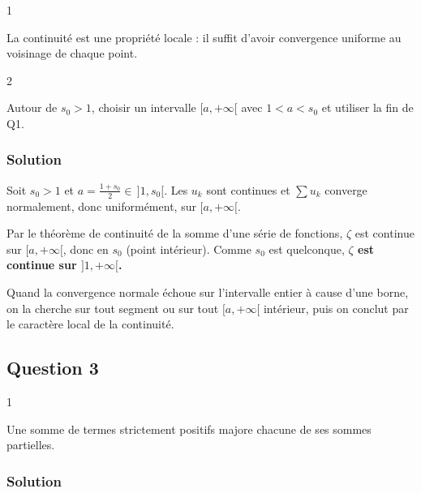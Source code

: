 \documentclass[11pt,a4paper]{article}
\begin{document}
\begin{indication}{1}

La continuité est une propriété locale : il suffit d'avoir convergence uniforme au voisinage de chaque point.

\end{indication}

\begin{indication}{2}

Autour de \(s_0>1\), choisir un intervalle \([a,+\infty[\) avec \(1<a<s_0\) et utiliser la fin de Q1.

\end{indication}

\hypertarget{solution-1}{%
\subsubsection{Solution}\label{solution-1}}

Soit \(s_0>1\) et \(a=\frac{1+s_0}2\in\,]1,s_0[\). Les \(u_k\) sont continues et \(\sum u_k\) converge normalement, donc uniformément, sur \([a,+\infty[\).

Par le théorème de continuité de la somme d'une série de fonctions, \(\zeta\) est continue sur \([a,+\infty[\), donc en \(s_0\) (point intérieur). Comme \(s_0\) est quelconque, \textbf{\(\zeta\) est continue sur \(]1,+\infty[\).}

\begin{methode}

Quand la convergence normale échoue sur l'intervalle entier à cause d'une borne, on la cherche sur tout segment ou sur tout \([a,+\infty[\) intérieur, puis on conclut par le caractère local de la continuité.

\end{methode}

\hypertarget{question-3}{%
\subsection{Question 3}\label{question-3}}

\begin{indication}{1}

Une somme de termes strictement positifs majore chacune de ses sommes partielles.

\end{indication}

\hypertarget{solution-2}{%
\subsubsection{Solution}\label{solution-2}}
\end{document}
